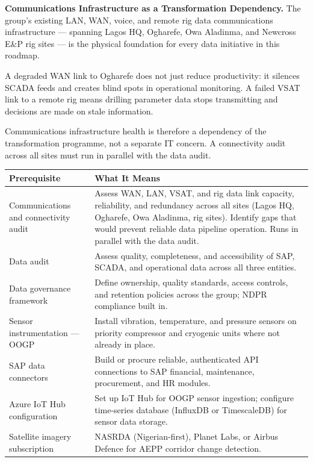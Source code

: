 \documentclass[10pt]{article}
\newcommand{\spacer}{\vspace{10pt}}
\begin{document}
\noindent\colorbox{primary!8}{%
\begin{minipage}{\dimexpr\textwidth-2\fboxsep}
  \vspace{6pt}
  \textbf{\color{primary}Communications Infrastructure as a Transformation Dependency.}\quad
  The group's existing LAN, WAN, voice, and remote rig data communications
  infrastructure --- spanning Lagos HQ, Ogharefe, Owa Aladinma, and Newcross
  E\&P rig sites --- is the physical foundation for every data initiative in
  this roadmap.

  \vspace{4pt}
  A degraded WAN link to Ogharefe does not just reduce productivity: it
  silences SCADA feeds and creates blind spots in operational monitoring.
  A failed VSAT link to a remote rig means drilling parameter data stops
  transmitting and decisions are made on stale information.

  \vspace{4pt}
  Communications infrastructure health is therefore a dependency of the
  transformation programme, not a separate IT concern. A connectivity
  audit across all sites must run in parallel with the data audit.
  \vspace{6pt}
\end{minipage}}

\spacer
\small
\begin{tabularx}{\columnwidth}{@{}lX@{}}
\toprule
\textbf{Prerequisite} & \textbf{What It Means} \\
\midrule
Communications and connectivity audit
  & Assess WAN, LAN, VSAT, and rig data link capacity, reliability, and
    redundancy across all sites (Lagos HQ, Ogharefe, Owa Aladinma, rig
    sites). Identify gaps that would prevent reliable data pipeline
    operation. Runs in parallel with the data audit. \\
Data audit
  & Assess quality, completeness, and accessibility of SAP, SCADA, and
    operational data across all three entities. \\
Data governance framework
  & Define ownership, quality standards, access controls, and retention
    policies across the group; NDPR compliance built in. \\
Sensor instrumentation --- OOGP
  & Install vibration, temperature, and pressure sensors on priority
    compressor and cryogenic units where not already in place. \\
SAP data connectors
  & Build or procure reliable, authenticated API connections to SAP
    financial, maintenance, procurement, and HR modules. \\
Azure IoT Hub configuration
  & Set up IoT Hub for OOGP sensor ingestion; configure time-series
    database (InfluxDB or TimescaleDB) for sensor data storage. \\
Satellite imagery subscription
  & NASRDA (Nigerian-first), Planet Labs, or Airbus Defence for
    AEPP corridor change detection. \\
\bottomrule
\end{tabularx}
\normalsize
\end{document}
